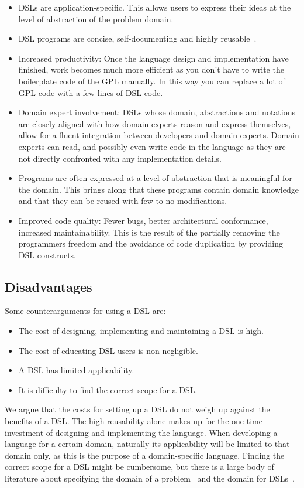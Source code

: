 \begin{itemize}
\item DSLs are application-specific. This allows users to express their ideas at the level of abstraction of the problem domain.
\item DSL programs are concise, self-documenting and highly reusable~\cite{Bentley:1986}.
\item Increased productivity: Once the language design and implementation have finished, work becomes much more efficient as you don't have to write the boilerplate code of the GPL manually. In this way you can replace a lot of GPL code with a few lines of DSL code.
\item Domain expert involvement: DSLs whose domain, abstractions and notations are closely aligned with how domain experts reason and express themselves, allow for a fluent integration between developers and domain experts. Domain experts can read, and possibly even write code in the language as they are not directly confronted with any implementation details.
\item Programs are often expressed at a level of abstraction that is meaningful for the domain. This brings along that these programs contain domain knowledge and that they can be reused with few to no modifications.
\item Improved code quality: Fewer bugs, better architectural conformance, increased maintainability. This is the result of the partially removing the programmers freedom and the avoidance of code duplication by providing DSL constructs.
\end{itemize}

\subsection*{Disadvantages}

Some counterarguments for using a DSL are:

\begin{itemize}
\item The cost of designing, implementing and maintaining a DSL is high.
\item The cost of educating DSL users is non-negligible.
\item A DSL has limited applicability.
\item It is difficulty to find the correct scope for a DSL.
\end{itemize}

We argue that the costs for setting up a DSL do not weigh up against the benefits of a DSL. The high reusability alone makes up for the one-time investment of designing and implementing the language. When developing a language for a certain domain, naturally its applicability will be limited to that domain only, as this is the purpose of a domain-specific language. Finding the correct scope for a DSL might be cumbersome, but there is a large body of literature about specifying the domain of a problem~\cite{Simos:1995} and the domain for DSLs~\cite{karsai2014design, gunther2010agile}. 

